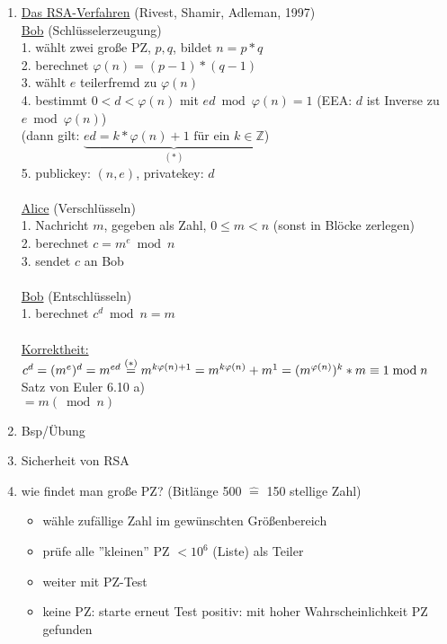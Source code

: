 \documentclass[a4paper,11pt]{article}
\begin{document}
\begin{enumerate}[label=\alph*)]
	\item\underline{Das RSA-Verfahren} (Rivest, Shamir, Adleman, 1997) \\
	\underline{Bob} (Schlüsselerzeugung) \\
	1. wählt zwei große PZ, $p,q$, bildet $n=p*q$ \\
	2. berechnet $\varphi(n)=(p-1)*(q-1)$ \\
	3. wählt $e$ teilerfremd zu $\varphi(n)$ \\
	4. bestimmt $0<d<\varphi(n)$ mit $ed\bmod\varphi(n)=1$ (EEA: $d$ ist Inverse zu $e\bmod\varphi(n)$) \\
	(dann gilt: $\underbrace{ed=k*\varphi(n)+1 \text{ für ein } k\in\mathbb{Z}}_{(*)}$) \\
	5. publickey: $(n,e)$, privatekey: $d$ \\
	\\
	\underline{Alice} (Verschlüsseln) \\
	1. Nachricht $m$, gegeben als Zahl, $0\leq m<n$ (sonst in Blöcke zerlegen) \\
	2. berechnet $c=m^e\bmod n$ \\
	3. sendet $c$ an Bob \\
	\\
	\underline{Bob} (Entschlüsseln) \\
	1. berechnet $c^d\bmod n=m$ \\
	\\
	\underline{Korrektheit:} \\
	$c^d=(m^e)^d=m^{ed} \\
	\overset{(*)}{=}m^{k\varphi(n)+1} \\
	=m^{k\varphi(n)}+m^1 \\
	=(m^{\varphi(n)})^k*m\equiv1\bmod n$ Satz von Euler 6.10 a) \\
	$=m(\bmod n)$
	\item Bsp/Übung
	\item Sicherheit von RSA
	\item wie findet man große PZ? (Bitlänge 500 $\widehat{=}$ 150 stellige Zahl)
		\begin{itemize}
		\item wähle zufällige Zahl im gewünschten Größenbereich
		\item prüfe alle ''kleinen'' PZ $<10^6$ (Liste) als Teiler
		\item weiter mit PZ-Test
		\item keine PZ: starte erneut
	Test positiv: mit hoher Wahrscheinlichkeit PZ gefunden
	\end{itemize}
\end{enumerate}
\end{document}
